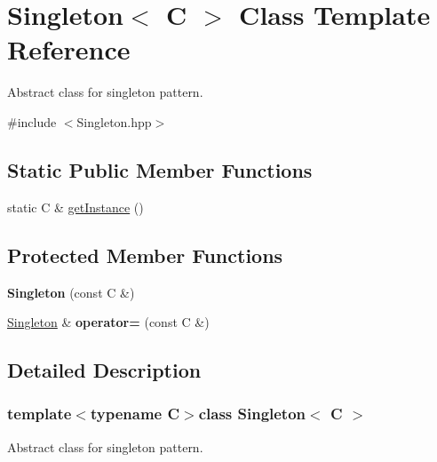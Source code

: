 \hypertarget{class_singleton}{\section{Singleton$<$ C $>$ Class Template Reference}
\label{class_singleton}
}


Abstract class for singleton pattern.  




{\ttfamily \#include $<$Singleton.\+hpp$>$}

\subsection*{Static Public Member Functions}
\begin{DoxyCompactItemize}
\item 
static C \& \hyperlink{class_singleton_a3fff22a8380f8ede383d370f2bfb89eb}{get\+Instance} ()
\end{DoxyCompactItemize}
\subsection*{Protected Member Functions}
\begin{DoxyCompactItemize}
\item 
\hypertarget{class_singleton_ae762ebbbd585ece6275ad8e10f5a0938}{{\bfseries Singleton} (const C \&)}\label{class_singleton_ae762ebbbd585ece6275ad8e10f5a0938}

\item 
\hypertarget{class_singleton_a87fd94d3f575a727c898e1f1087fe2a0}{\hyperlink{class_singleton}{Singleton} \& {\bfseries operator=} (const C \&)}\label{class_singleton_a87fd94d3f575a727c898e1f1087fe2a0}

\end{DoxyCompactItemize}


\subsection{Detailed Description}
\subsubsection*{template$<$typename C$>$class Singleton$<$ C $>$}

Abstract class for singleton pattern. 

